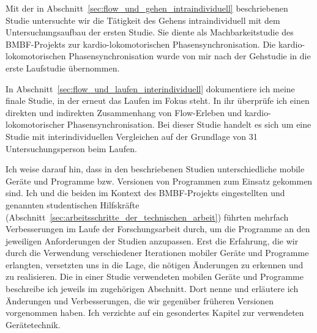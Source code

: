 Mit der in Abschnitt~\ref{sec:flow_und_gehen_intraindividuell} beschriebenen Studie untersuchte wir die Tätigkeit des Gehens intraindividuell mit dem Untersuchungsaufbau der ersten Studie. Sie diente als Machbarkeitstudie des \acs{BMBF}-Projekts zur kardio-lokomotorischen Phasensynchronisation. Die kardio-lokomotorischen Phasensynchronisation wurde von mir nach der Gehstudie in die erste Laufstudie übernommen. 

In Abschnitt~\ref{sec:flow_und_laufen_interindividuell} dokumentiere ich meine finale Studie, in der erneut das Laufen im Fokus steht. In ihr überprüfe ich einen direkten und indirekten Zusammenhang von Flow-Erleben und kardio-lokomotorischer Phasensynchronisation. Bei dieser Studie handelt es sich um eine Studie mit interindividuellen Vergleichen auf der Grundlage von 31 Untersuchungsperson beim Laufen. 

Ich weise darauf hin, dass in den beschriebenen Studien unterschiedliche mobile Geräte und Programme bzw. Versionen von Programmen zum Einsatz gekommen sind. Ich und die beiden im Kontext des \acs{BMBF}-Projekts eingestellten und genannten studentischen Hilfskräfte (Abschnitt~\ref{sec:arbeitsschritte_der_technischen_arbeit}) führten mehrfach Verbesserungen im Laufe der Forschungsarbeit durch, um die Programme an den jeweiligen Anforderungen der Studien anzupassen. Erst die Erfahrung, die wir durch die Verwendung verschiedener Iterationen mobiler Geräte und Programme erlangten, versetzten uns in die Lage, die nötigen Änderungen zu erkennen und zu realisieren. Die in einer Studie verwendeten mobilen Geräte und Programme beschreibe ich jeweils im zugehörigen Abschnitt. Dort nenne und erläutere ich Änderungen und Verbesserungen, die wir gegenüber früheren Versionen vorgenommen haben. Ich verzichte auf ein gesondertes Kapitel zur verwendeten Gerätetechnik.